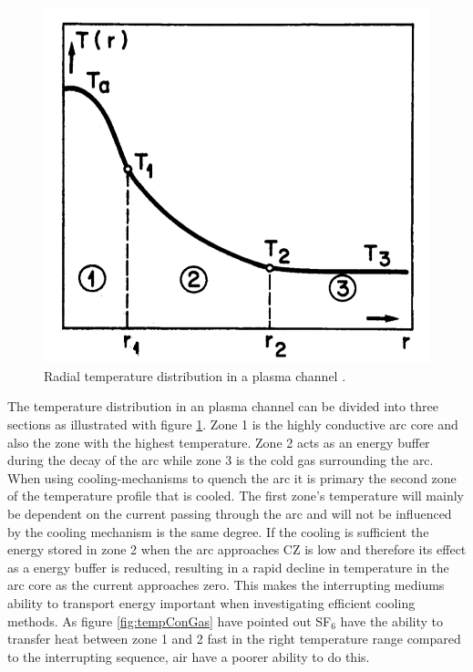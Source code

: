\documentclass[10pt,a4paper]{article}
\begin{document}
\begin{figure}[H]
\centering
\includegraphics[scale=0.3]{Bilder/Theory/tempZonesArc.png}
\caption{Radial temperature distribution in a plasma channel \cite{bib:TDCIGBB}.} \label{fig:tempDist1}
\end{figure}

The temperature distribution in an plasma channel can be divided into three sections \cite{bib:TDCIGBB} as illustrated with figure \ref{fig:tempDist1}. Zone 1 is the highly conductive arc core and also the zone with the highest temperature. Zone 2 acts as an energy buffer during the decay of the arc while zone 3 is the cold gas surrounding the arc. When using cooling-mechanisms to quench the arc it is primary the second zone of the temperature profile that is cooled. The first zone's temperature will mainly be dependent on the current passing through the arc and will not be influenced by the cooling mechanism is the same degree. If the cooling is sufficient the energy stored in zone 2 when the arc approaches CZ is low and therefore its effect as a energy buffer is reduced, resulting in a rapid decline in temperature in the arc core as the current approaches zero. This makes the interrupting mediums ability to transport energy important when investigating efficient cooling methods. As figure \ref{fig:tempConGas} have pointed out SF$_6$ have the ability to transfer heat between zone 1 and 2 fast in the right temperature range compared to the interrupting sequence, air have a poorer ability to do this.
\end{document}
